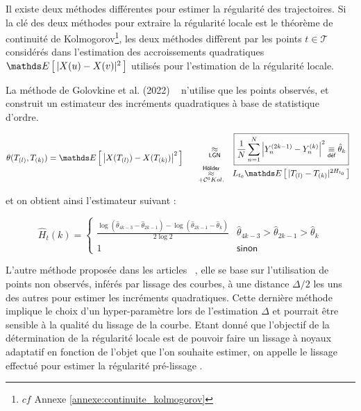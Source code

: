 
Il existe deux méthodes différentes pour estimer la régularité des trajectoires. Si la clé des deux méthodes pour extraire la régularité locale est le théorème de continuité de Kolmogorov\footnote{$cf$ Annexe \ref{annexe:continuite_kolmogorov}}, les deux méthodes diffèrent par les points $t \in \mathcal T$ considérés dans l'estimation des accroissements quadratiques $\esperance{ \vert X(u) - X(v) \vert^2 }$ utilisés pour l'estimation de la régularité locale.

La méthode de Golovkine et al. (2022) ~\cite[pages : 7—9]{golovkineRegularityOnlineEstimationNoisyCurve} n'utilise que les points observés, et construit un estimateur des incréments quadratiques à base de statistique d'ordre.

\begin{equation*}
	\theta( T_{(l)}, T_{(k)}) = \esperance{ \left| X( T_{(l)}) - X(T_{(k)}) \right|^2 }  \begin{array}{ccc}
		 & \quad \underset {\textsf{LGN}} \approx
		 & \boxed{\frac 1 {N} \sum\limits_{n=1}^N \left| \statrang Y n {2k-1} - \statrang Y n k \right|^2 \isdef \hat \theta_k}
		\\
		 & \, \underset {+ \mathcal C^0 Kol.} {\overset {\textsf{Hölder}} \approx}
		 & L_{t_0} \esperance{| \ordered T l - \ordered T k |^{2H_{t_0}}}
	\end{array}
\end{equation*}

et on obtient ainsi l'estimateur suivant :

\begin{equation*}
	\widehat H_{t}(k) =
	\begin{cases} \displaystyle\frac{\log\left( \hat \theta_{4k-3} - \hat \theta_{2k-1}  \right) - \log \left(  \hat\theta_{2k-1} - \hat \theta_k \right)}{2\log 2}
		 & \hat \theta_{4k-3} > \hat \theta_{2k-1} > \hat \theta_{k}
		\\
		1
		 & \textsf{sinon}
	\end{cases}
\end{equation*}


L'autre méthode proposée dans les articles ~\cite{golovkine2021adaptive,maissoro-SmoothnessFTSweakDep}, elle se base sur l'utilisation de points non observés, inférés par lissage des courbes, à une distance $\Delta / 2$ les uns des autres pour estimer les incréments quadratiques. Cette dernière méthode implique le choix d'un hyper-paramètre lors de l'estimation $\Delta$ et pourrait être sensible à la qualité du lissage de la courbe. Etant donné que l'objectif de la détermination de la régularité locale est de pouvoir faire un lissage à noyaux adaptatif en fonction de l'objet que l'on souhaite estimer, on appelle le lissage effectué pour estimer la régularité \og pré-lissage \fg.

